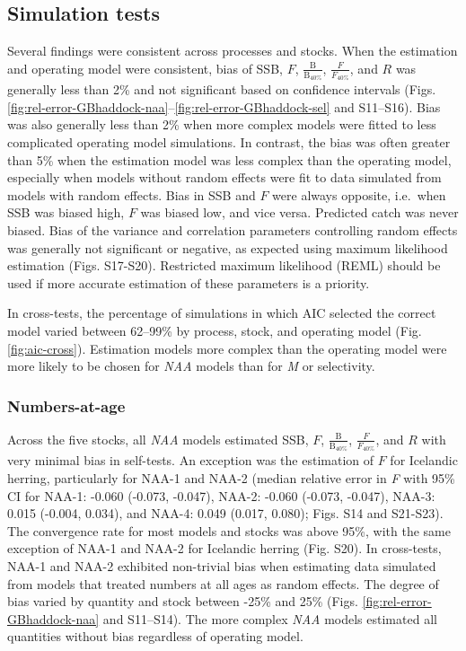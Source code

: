 \documentclass[]{article}
\begin{document}
\hypertarget{simulation-tests-1}{%
\subsection{Simulation tests}\label{simulation-tests-1}}

Several findings were consistent across processes and stocks. When the
estimation and operating model were consistent, bias of SSB, \(F\),
\(\frac{\text{B}}{\text{B}_{40\%}}\), \(\frac{F}{F_{40\%}}\), and \(R\)
was generally less than 2\% and not significant based on confidence
intervals (Figs.
\ref{fig:rel-error-GBhaddock-naa}--\ref{fig:rel-error-GBhaddock-sel} and
S11--S16). Bias was also generally less than 2\% when more complex
models were fitted to less complicated operating model simulations. In
contrast, the bias was often greater than 5\% when the estimation model
was less complex than the operating model, especially when models
without random effects were fit to data simulated from models with
random effects. Bias in SSB and \(F\) were always opposite, i.e.~when
SSB was biased high, \(F\) was biased low, and vice versa. Predicted
catch was never biased. Bias of the variance and correlation parameters
controlling random effects was generally not significant or negative, as
expected using maximum likelihood estimation (Figs. S17-S20). Restricted
maximum likelihood (REML) should be used if more accurate estimation of
these parameters is a priority.

In cross-tests, the percentage of simulations in which AIC selected the
correct model varied between 62--99\% by process, stock, and operating
model (Fig. \ref{fig:aic-cross}). Estimation models more complex than
the operating model were more likely to be chosen for \emph{NAA} models
than for \emph{M} or selectivity.

\hypertarget{numbers-at-age}{%
\subsubsection{Numbers-at-age}\label{numbers-at-age}}

Across the five stocks, all \emph{NAA} models estimated SSB, \(F\),
\(\frac{\text{B}}{\text{B}_{40\%}}\), \(\frac{F}{F_{40\%}}\), and \(R\)
with very minimal bias in self-tests. An exception was the estimation of
\(F\) for Icelandic herring, particularly for NAA-1 and NAA-2 (median
relative error in \emph{F} with 95\% CI for NAA-1: -0.060 (-0.073,
-0.047), NAA-2: -0.060 (-0.073, -0.047), NAA-3: 0.015 (-0.004, 0.034),
and NAA-4: 0.049 (0.017, 0.080); Figs. S14 and S21-S23). The convergence
rate for most models and stocks was above 95\%, with the same exception
of NAA-1 and NAA-2 for Icelandic herring (Fig. S20). In cross-tests,
NAA-1 and NAA-2 exhibited non-trivial bias when estimating data
simulated from models that treated numbers at all ages as random
effects. The degree of bias varied by quantity and stock between -25\%
and 25\% (Figs. \ref{fig:rel-error-GBhaddock-naa} and S11--S14). The
more complex \emph{NAA} models estimated all quantities without bias
regardless of operating model.
\end{document}
